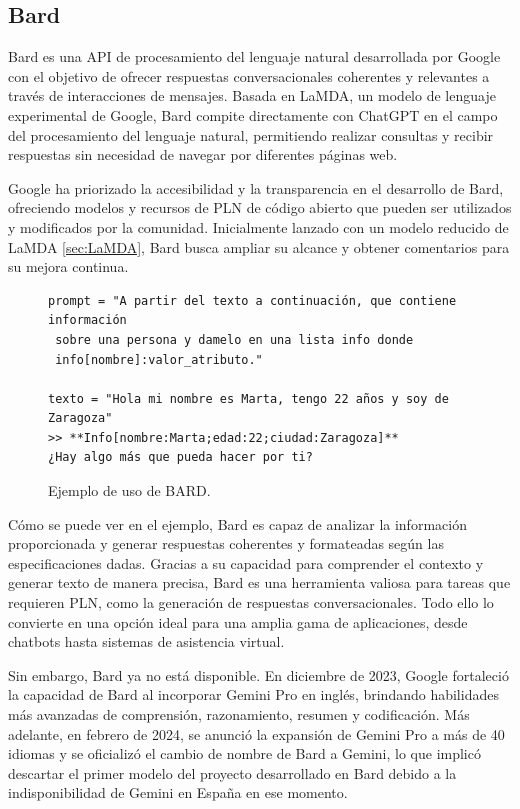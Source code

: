 \subsection{Bard}
Bard es una API de procesamiento del lenguaje natural desarrollada por Google con el objetivo de ofrecer respuestas conversacionales coherentes y relevantes a través de interacciones de mensajes. Basada en LaMDA, un modelo de lenguaje experimental de Google, Bard compite directamente con ChatGPT en el campo del procesamiento del lenguaje natural, permitiendo realizar consultas y recibir respuestas sin necesidad de navegar por diferentes páginas web.

Google ha priorizado la accesibilidad y la transparencia en el desarrollo de Bard, ofreciendo modelos y recursos de PLN de código abierto que pueden ser utilizados y modificados por la comunidad. Inicialmente lanzado con un modelo reducido de LaMDA \ref{sec:LaMDA}, Bard busca ampliar su alcance y obtener comentarios para su mejora continua.
\begin{figure}[h]
	\centering
	\begin{verbatim}
prompt = "A partir del texto a continuación, que contiene información
 sobre una persona y damelo en una lista info donde
 info[nombre]:valor_atributo."

texto = "Hola mi nombre es Marta, tengo 22 años y soy de Zaragoza"
>> **Info[nombre:Marta;edad:22;ciudad:Zaragoza]** 
¿Hay algo más que pueda hacer por ti?
	\end{verbatim}
	\caption{ Ejemplo de uso de BARD.}
	\label{fig:ejemploBARD}
\end{figure}




Cómo se puede ver en el ejemplo, Bard es capaz de analizar la información proporcionada y generar respuestas coherentes y formateadas según las especificaciones dadas. Gracias a su capacidad para comprender el contexto y generar texto de manera precisa, Bard es una herramienta valiosa para tareas que requieren PLN, como la generación de respuestas conversacionales. Todo ello lo convierte en una opción ideal para una amplia gama de aplicaciones, desde chatbots hasta sistemas de asistencia virtual. 

Sin embargo, Bard ya no está disponible. En diciembre de 2023, Google fortaleció la capacidad de Bard al incorporar Gemini Pro en inglés, brindando habilidades más avanzadas de comprensión, razonamiento, resumen y codificación. Más adelante, en febrero de 2024, se anunció la expansión de Gemini Pro a más de 40 idiomas y se oficializó el cambio de nombre de Bard a Gemini, lo que implicó descartar el primer modelo del proyecto desarrollado en Bard debido a la indisponibilidad de Gemini en España en ese momento.

